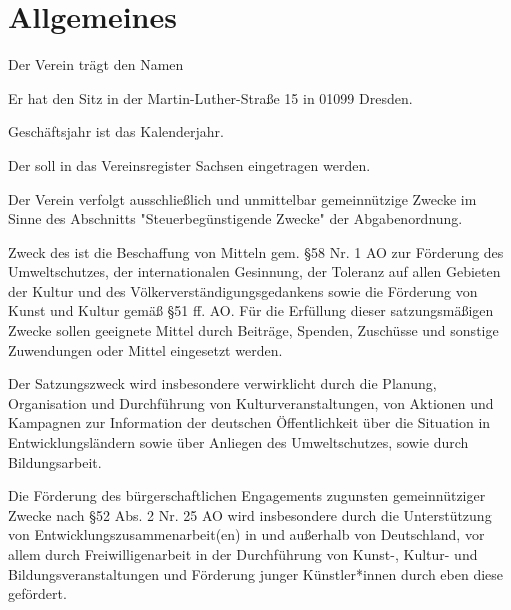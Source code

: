 



\subject{Vereinssatzung}
\title{\name}
\subtitle{Vereinssatzung für den \name}
\date{\today \\ \version}
\maketitle

\tableofcontents

\appendix

\section{Allgemeines}
\begin{contract}


    Der Verein trägt den Namen \name

    Er hat den Sitz in der Martin-Luther-Straße 15 in 01099 Dresden.

    Geschäftsjahr ist das Kalenderjahr.

    Der \name soll in das Vereinsregister Sachsen eingetragen werden.


    \label{clause:vereinszweck}

    Der Verein verfolgt ausschließlich und unmittelbar gemeinnützige Zwecke im Sinne des Abschnitts "Steuerbegünstigende Zwecke" der Abgabenordnung.
    \label{zweckbindung}

    Zweck des \name ist die Beschaffung von Mitteln gem. \S 58 Nr. 1 AO zur Förderung des Umweltschutzes, der internationalen Gesinnung, der Toleranz auf allen Gebieten der Kultur und des Völkerverständigungsgedankens sowie die Förderung von Kunst und Kultur gemäß \S 51 ff. AO. Für die Erfüllung dieser satzungsmäßigen Zwecke sollen geeignete Mittel durch Beiträge, Spenden, Zuschüsse und sonstige Zuwendungen oder Mittel eingesetzt werden.

    Der Satzungszweck wird insbesondere verwirklicht durch die Planung, Organisation und Durchführung von Kulturveranstaltungen, von Aktionen und Kampagnen zur Information der deutschen Öffentlichkeit über die Situation in Entwicklungsländern sowie über Anliegen des Umweltschutzes, sowie durch Bildungsarbeit.

    Die Förderung des bürgerschaftlichen Engagements zugunsten gemeinnütziger Zwecke nach \S 52 Abs. 2 Nr. 25 AO wird insbesondere durch die Unterstützung von Entwicklungszusammenarbeit(en) in und außerhalb von Deutschland, vor allem durch Freiwilligenarbeit in der Durchführung von Kunst-, Kultur- und Bildungsveranstaltungen und Förderung junger Künstler*innen durch eben diese gefördert.


\end{contract}
